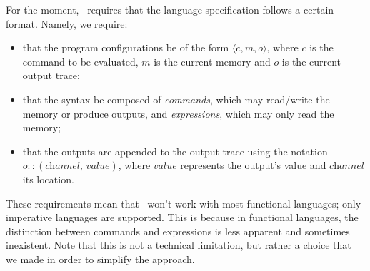 \documentclass[conference]{IEEEtran}
\begin{document}
For the moment, \ottifc\ requires that the language specification follows a certain format. Namely, we require:
\begin{itemize}
	\item that the program configurations be of the form $\langle \textit{c}, \textit{m}, \textit{o}\rangle$, where $c$ is the command to be evaluated, $m$ is the current memory and $o$ is the current output trace;
	\item that the syntax be composed of \emph{commands}, which may read/write the memory or produce outputs, and \emph{expressions}, which may only read the memory;
	\item that the outputs are appended to the output trace using the notation $o\!::\!(\textit{channel},\, \textit{value})$, where $\textit{value}$ represents the output's value and $\textit{channel}$ its location.
\end{itemize}
These requirements mean that \ottifc\ won't work with most functional languages; only imperative languages are supported. This is because in functional languages, the distinction between commands and expressions is less apparent and sometimes inexistent. Note that this is not a technical limitation, but rather a choice that we made in order to simplify the approach. 

\end{document}
